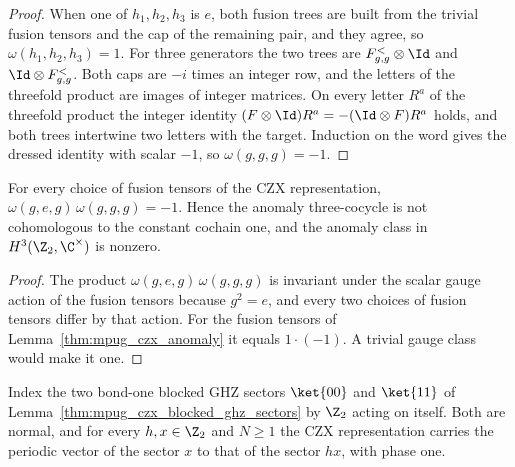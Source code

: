 \begin{proof}\leanok
    When one of $h_1,h_2,h_3$ is $e$, both fusion trees are built from the
    trivial fusion tensors and the cap of the remaining pair, and they agree,
    so $\omega(h_1,h_2,h_3)=1$. For three generators the two trees are
    $F^<_{g,g}\otimes\Id$ and $\Id\otimes F^<_{g,g}$. Both caps are $-i$ times
    an integer row, and the letters of the threefold product are images of
    integer matrices. On every letter $R^a$ of the threefold product the
    integer identity $(F\otimes\Id)R^a=-(\Id\otimes F)R^a$ holds, and both
    trees intertwine two letters with the target. Induction on the word gives
    the dressed identity with scalar $-1$, so $\omega(g,g,g)=-1$.
\end{proof}

\begin{lemma}
    \label{thm:mpug_czx_anomaly_class}
    \leanok
    For every choice of fusion tensors of the CZX representation,
    $\omega(g,e,g)\,\omega(g,g,g)=-1$. Hence the anomaly three-cocycle is not
    cohomologous to the constant cochain one, and the anomaly class in
    $H^3(\Z_2,\C^\times)$ is nonzero.
\end{lemma}

\begin{proof}\leanok
    The product $\omega(g,e,g)\,\omega(g,g,g)$ is invariant under the scalar
    gauge action of the fusion tensors because $g^2=e$, and every two choices
    of fusion tensors differ by that action. For the fusion tensors of
    Lemma~\ref{thm:mpug_czx_anomaly} it equals $1\cdot(-1)$. A trivial gauge
    class would make it one.
\end{proof}

\begin{lemma}
    \label{thm:mpug_czx_ghz_blocks}
    \leanok
    Index the two bond-one blocked GHZ sectors $\ket{00}$ and $\ket{11}$ of
    Lemma~\ref{thm:mpug_czx_blocked_ghz_sectors} by $\Z_2$ acting on itself.
    Both are normal, and for every $h,x\in\Z_2$ and $N\geq1$ the CZX
    representation carries the periodic vector of the sector $x$ to that of
    the sector $hx$, with phase one.
\end{lemma}

